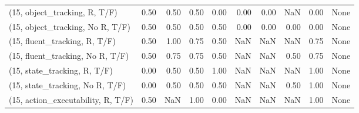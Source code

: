 \begin{table*}[h!]
\begin{adjustbox}{width=2\columnwidth,center}
\begin{tabular}{lrrr|rrr|rrr}
\midrule
(15, object\_tracking, R, T/F)         &                      0.50 &                  0.50 &                      0.50 &                          0.00 &                      0.00 &                          0.00 &                                    NaN &                               0.00 &                                  None \\
(15, object\_tracking, No R, T/F)      &                      0.50 &                  0.50 &                      0.50 &                          0.50 &                      0.00 &                          0.00 &                                   0.00 &                               0.00 &                                  None \\
(15, fluent\_tracking, R, T/F)         &                      0.50 &                  1.00 &                      0.75 &                          0.50 &                       NaN &                           NaN &                                    NaN &                               0.75 &                                  None \\
(15, fluent\_tracking, No R, T/F)      &                      0.50 &                  0.75 &                      0.75 &                          0.50 &                       NaN &                           NaN &                                   0.50 &                               0.75 &                                  None \\
(15, state\_tracking, R, T/F)          &                      0.00 &                  0.50 &                      0.50 &                          1.00 &                       NaN &                           NaN &                                    NaN &                               1.00 &                                  None \\
(15, state\_tracking, No R, T/F)       &                      0.00 &                  0.50 &                      0.50 &                          0.50 &                       NaN &                           NaN &                                   0.50 &                               1.00 &                                  None \\
(15, action\_executability, R, T/F)    &                      0.50 &                   NaN &                      1.00 &                          0.00 &                       NaN &                           NaN &                                    NaN &                               1.00 &                                  None \\

\end{tabular}
\end{adjustbox}
\end{table*}
